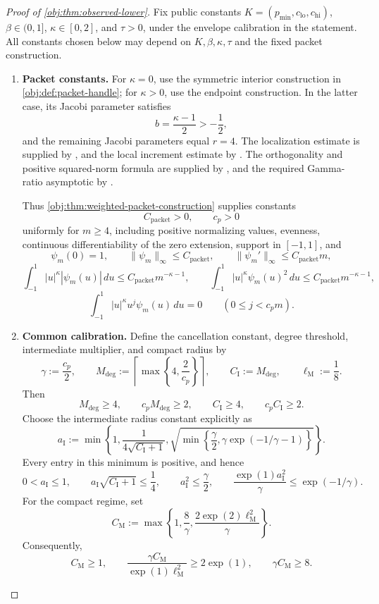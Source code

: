 \begin{proof}[Proof of \cref{obj:thm:observed-lower}]
Fix public constants \(K=(p_{\min},c_{\mathrm{lo}},c_{\mathrm{hi}})\), \(\beta\in(0,1]\), \(\kappa\in[0,2]\), and \(\tau>0\), under the envelope calibration in the statement. All constants chosen below may depend on \(K,\beta,\kappa,\tau\) and the fixed packet construction.

\begin{enumerate}
\item \textbf{Packet constants.}
For \(\kappa=0\), use the symmetric interior construction in \cref{obj:def:packet-handle}; for \(\kappa>0\), use the endpoint construction. In the latter case, its Jacobi parameter satisfies
\[
b=\frac{\kappa-1}{2}>-\frac12,
\]
and the remaining Jacobi parameters equal \(r=4\). The localization estimate is supplied by \citep[Theorem 2.4, equation (2.14)]{PetrushevXu2005}, and the local increment estimate by \citep[Theorem 2.2, equation (2.4)]{https://people.math.sc.edu/pencho/Publications/kpx-06-28-06-web.pdf}. The orthogonality and positive squared-norm formula are supplied by \citep[Table 18.3.1, Jacobi row and caption]{https://dlmf.nist.gov/18.3}, and the required Gamma-ratio asymptotic by \citep[equation (5.11.12), restricted to the positive real axis]{https://dlmf.nist.gov/5.11.E12}.

Thus \cref{obj:thm:weighted-packet-construction} supplies constants
\[
C_{\mathrm{packet}}>0,\qquad c_p>0
\]
uniformly for \(m\ge4\), including positive normalizing values, evenness, continuous differentiability of the zero extension, support in \([-1,1]\), and
\[
\psi_m(0)=1,\qquad
\|\psi_m\|_\infty\le C_{\mathrm{packet}},\qquad
\|\psi_m'\|_\infty\le C_{\mathrm{packet}}m,
\]
\[
\int_{-1}^{1}|u|^\kappa|\psi_m(u)|\,du
\le C_{\mathrm{packet}}m^{-\kappa-1},
\qquad
\int_{-1}^{1}|u|^\kappa\psi_m(u)^2\,du
\le C_{\mathrm{packet}}m^{-\kappa-1},
\]
\[
\int_{-1}^{1}|u|^\kappa u^j\psi_m(u)\,du=0
\qquad(0\le j<c_pm).
\]

\item \textbf{Common calibration.}
Define the cancellation constant, degree threshold, intermediate multiplier, and compact radius by
\[
\gamma:=\frac{c_p}{2},\qquad
M_{\mathrm{deg}}:=\left\lceil\max\left\{4,\frac{2}{c_p}\right\}\right\rceil,
\qquad
C_{\mathrm I}:=M_{\mathrm{deg}},\qquad
\ell_{\mathrm M}:=\frac18.
\]
Then
\[
M_{\mathrm{deg}}\ge4,\qquad
c_pM_{\mathrm{deg}}\ge2,\qquad
C_{\mathrm I}\ge4,\qquad c_pC_{\mathrm I}\ge2.
\]
Choose the intermediate radius constant explicitly as
\[
a_{\mathrm I}:=
\min\left\{
1,\frac{1}{4\sqrt{C_{\mathrm I}+1}},
\sqrt{\min\left\{\frac{\gamma}{2},
\gamma\exp(-1/\gamma-1)\right\}}
\right\}.
\]
Every entry in this minimum is positive, and hence
\[
0<a_{\mathrm I}\le1,\qquad
a_{\mathrm I}\sqrt{C_{\mathrm I}+1}\le\frac14,\qquad
a_{\mathrm I}^2\le\frac{\gamma}{2},\qquad
\frac{\exp(1)a_{\mathrm I}^2}{\gamma}\le\exp(-1/\gamma).
\]
For the compact regime, set
\[
C_{\mathrm M}:=
\max\left\{
1,\frac8\gamma,\frac{2\exp(2)\ell_{\mathrm M}^2}{\gamma}
\right\}.
\]
Consequently,
\[
C_{\mathrm M}\ge1,\qquad
\frac{\gamma C_{\mathrm M}}{\exp(1)\ell_{\mathrm M}^2}
\ge2\exp(1),\qquad
\gamma C_{\mathrm M}\ge8.
\]


\end{enumerate}
\end{proof}
